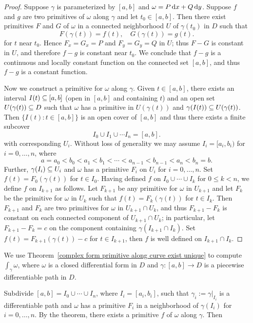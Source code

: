 \begin{proof}
Suppose $\gamma$ is parameterized by $[a,b]$ and $\omega=P\mathop{}\!\mathrm{d} x+Q\mathop{}\!\mathrm{d} y$. Suppose $f$ and $g$ are two primitives of $\omega$ along $\gamma$ and let $t_0\in[a,b]$. Then there exist primitives $F$ and $G$ of $\omega$ in a connected neighborhood $U$ of $\gamma(t_0)$ in $D$ such that
\[F(\gamma(t))=f(t),\quad G(\gamma(t))=g(t).\]
for $t$ near $t_0$. Hence $F_x=G_x=P$ and $F_y=G_y=Q$ in $U$; thus $F-G$ is constant in $U$, and therefore $f-g$ is constant near $t_0$. We conclude that $f-g$ is a continuous and locally constant function on the connected set $[a,b]$, and thus $f-g$ is a constant function.\par
Now we construct a primitive for $\omega$ along $\gamma$. Given $t\in[a,b]$, there exists an interval $I(t)\subseteq[a,b]$ (open in $[a,b]$ and containing $t$) and an open set $U(\gamma(t))\subseteq D$ such that $\omega$ has a primitive in $U(\gamma(t))$ and $\gamma(I(t))\subseteq U(\gamma(t))$. Then $\{I(t):t\in[a,b]\}$ is an open cover of $[a,b]$ and thus there exists a finite subcover
\[I_0\cup I_1\cup\cdots I_n=[a,b].\]
with corresponding $U_i$. Without loss of generality we may assume $I_i=[a_i,b_i)$ for $i=0,\dots,n$, where
\[a=a_0<b_0<a_1<b_1<\cdots<a_{n-1}<b_{n-1}<a_n<b_n=b.\]
Further, $\gamma(I_i)\subseteq U_i$ and $\omega$ has a primitive $F_i$ on $U_i$ for $i=0,\dots,n$. Set $f(t)=F_0(\gamma(t))$ for $t\in I_0$. Having defined $f$ on $I_0\cup\cdots\cup I_k$ for $0\leq k<n$, we define $f$ on $I_{k+1}$ as follows. Let $F_{k+1}$ be any primitive for $\omega$ in $U_{k+1}$ and let $F_k$ be the primitive for $\omega$ in $U_k$ such that $f(t)=F_k(\gamma(t))$ for $t\in I_k$. Then $F_{k+1}$ and $F_k$ are two primitives for $\omega$ in $U_{k+1}\cap U_k$, and thus $F_{k+1}-F_k$ is constant on each connected component of $U_{k+1}\cap U_k$; in particular, let $F_{k+1}-F_{k}=c$ on the component containing $\gamma(I_{k+1}\cap I_k)$. Set $f(t)=F_{k+1}(\gamma(t))-c$ for $t\in I_{k+1}$, then $f$ is well defined on $I_{k+1}\cap I_k$.
\end{proof}
We use Theorem~\ref{complex form primitive along curve exist unique} to compute $\int_{\gamma}\omega$, where $\omega$ is a closed differential form in $D$ and $\gamma:[a,b]\to D$ is a piecewise differentiable path in $D$.\par
Subdivide $[a,b]=I_0\cup\cdots\cup I_n$, where $I_i=[a_i,b_i]$, such that $\gamma_i:=\gamma|_{I_i}$ is a differentiable path and $\omega$ has a primitive $F_i$ in a neighborhood of $\gamma(I_i)$ for $i=0,\dots,n$. By the theorem, there exists a primitive $f$ of $\omega$ along $\gamma$. Then
